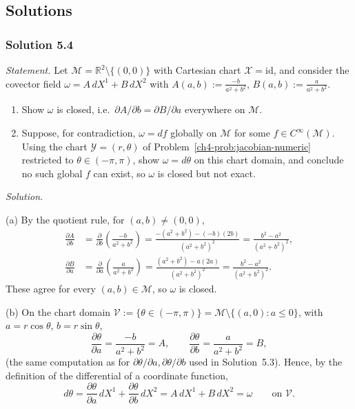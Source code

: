 \documentclass[11pt]{article}
\newcommand{\Cinf}{C^\infty(\mathcal M)}
\begin{document}
\subsection*{Solutions}

\subsubsection*{Solution 5.4}

\noindent\textit{Statement.} Let $\mathcal M=\mathbb R^2\setminus\{(0,0)\}$
with Cartesian chart $\mathcal X=\mathrm{id}$, and consider the covector
field $\omega=A\,dX^1+B\,dX^2$ with $A(a,b):=\frac{-b}{a^2+b^2}$,
$B(a,b):=\frac{a}{a^2+b^2}$.
\begin{enumerate}[label=(\alph*)]
  \item Show $\omega$ is closed, i.e.\ $\partial A/\partial b=\partial
  B/\partial a$ everywhere on $\mathcal M$.
  \item Suppose, for contradiction, $\omega=df$ globally on $\mathcal M$
  for some $f\in\Cinf$. Using the chart $\mathcal Y=(r,\theta)$ of
  Problem~\ref{ch4-prob:jacobian-numeric} restricted to $\theta\in(-\pi,\pi)$,
  show $\omega=d\theta$ on this chart domain, and conclude no such global
  $f$ can exist, so $\omega$ is closed but not exact.
\end{enumerate}

\medskip
\noindent\textit{Solution.}

(a) By the quotient rule, for $(a,b)\neq(0,0)$,
\begin{align*}
\frac{\partial A}{\partial b} &= \frac{\partial}{\partial b}\left(\frac{-b}{a^2+b^2}\right) = \frac{-(a^2+b^2)-(-b)(2b)}{(a^2+b^2)^2} = \frac{b^2-a^2}{(a^2+b^2)^2}, \\
\frac{\partial B}{\partial a} &= \frac{\partial}{\partial a}\left(\frac{a}{a^2+b^2}\right) = \frac{(a^2+b^2)-a(2a)}{(a^2+b^2)^2} = \frac{b^2-a^2}{(a^2+b^2)^2}.
\end{align*}
These agree for every $(a,b)\in\mathcal M$, so $\omega$ is closed.

(b) On the chart domain $\mathcal V:=\{\theta\in(-\pi,\pi)\}=\mathcal
M\setminus\{(a,0):a\leq0\}$, with $a=r\cos\theta$, $b=r\sin\theta$,
\[
\frac{\partial\theta}{\partial a} = \frac{-b}{a^2+b^2} = A,\qquad \frac{\partial\theta}{\partial b} = \frac{a}{a^2+b^2} = B,
\]
(the same computation as for $\partial\theta/\partial a,\partial\theta
/\partial b$ used in Solution~5.3). Hence, by the definition of the
differential of a coordinate function,
\[
d\theta = \frac{\partial\theta}{\partial a}\,dX^1 + \frac{\partial\theta}{\partial b}\,dX^2 = A\,dX^1+B\,dX^2 = \omega \qquad\text{on }\mathcal V.
\]
\end{document}

